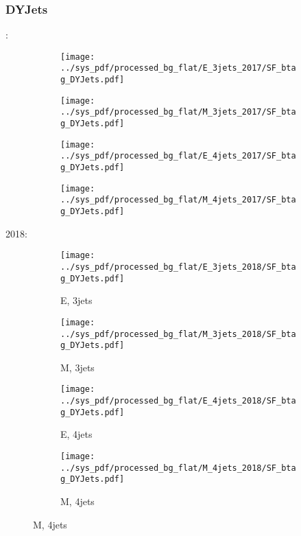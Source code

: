 \documentclass{beamer}
\begin{document}
\begin{frame}
\frametitle{DYJets}
\fontsize{5}{1}:
\begin{figure}
\centering
\begin{subfigure}[b]{0.24\textwidth}
\texttt{[image: ../sys\_pdf/processed\_bg\_flat/E\_3jets\_2017/SF\_btag\_DYJets.pdf]}
\end{subfigure}
\begin{subfigure}[b]{0.24\textwidth}
\texttt{[image: ../sys\_pdf/processed\_bg\_flat/M\_3jets\_2017/SF\_btag\_DYJets.pdf]}
\end{subfigure}
\begin{subfigure}[b]{0.24\textwidth}
\texttt{[image: ../sys\_pdf/processed\_bg\_flat/E\_4jets\_2017/SF\_btag\_DYJets.pdf]}
\end{subfigure}
\begin{subfigure}[b]{0.24\textwidth}
\texttt{[image: ../sys\_pdf/processed\_bg\_flat/M\_4jets\_2017/SF\_btag\_DYJets.pdf]}
\end{subfigure}
\end{figure}
2018:
\begin{figure}
\centering
\begin{subfigure}[b]{0.24\textwidth}
\texttt{[image: ../sys\_pdf/processed\_bg\_flat/E\_3jets\_2018/SF\_btag\_DYJets.pdf]}
\captionsetup{font=tiny}
\caption{E, 3jets}
\end{subfigure}
\begin{subfigure}[b]{0.24\textwidth}
\texttt{[image: ../sys\_pdf/processed\_bg\_flat/M\_3jets\_2018/SF\_btag\_DYJets.pdf]}
\captionsetup{font=tiny}
\caption{M, 3jets}
\end{subfigure}
\begin{subfigure}[b]{0.24\textwidth}
\texttt{[image: ../sys\_pdf/processed\_bg\_flat/E\_4jets\_2018/SF\_btag\_DYJets.pdf]}
\captionsetup{font=tiny}
\caption{E, 4jets}
\end{subfigure}
\begin{subfigure}[b]{0.24\textwidth}
\texttt{[image: ../sys\_pdf/processed\_bg\_flat/M\_4jets\_2018/SF\_btag\_DYJets.pdf]}
\captionsetup{font=tiny}
\caption{M, 4jets}
\end{subfigure}
\end{figure}
\end{frame}
\end{document}
